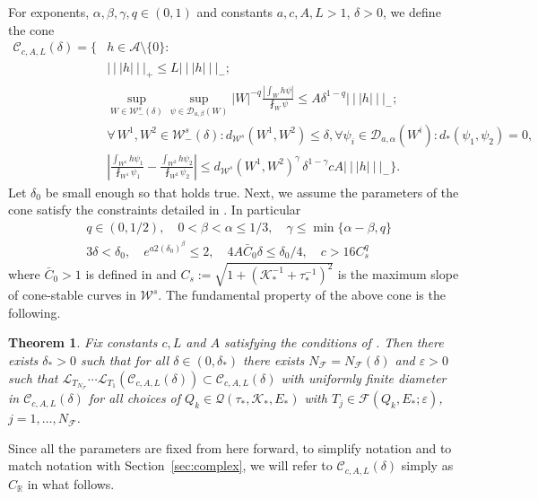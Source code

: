 \documentclass{amsart}
\numberwithin{equation}{section}
\newtheorem{thm}{Theorem}[section]
\newcommand\cA{{\mathcal A}}
\newcommand\cC{{\mathcal C}}
\newcommand\cD{{\mathcal D}}
\newcommand\cF{{\mathcal F}}
\newcommand\cK{{\mathcal K}}
\newcommand\cL{{\mathcal L}}
\newcommand\cQ{{\mathcal Q}}
\newcommand\cW{{\mathcal W}}
\newcommand\bR{{\mathbb R}}
\newcommand\ve{\varepsilon}
\newcommand{\tri}{{|\:\!\!|\:\!\!|}}
\begin{document}
For exponents, $\alpha, \beta, \gamma, q \in (0,1)$  and constants $a, c, A, L >1$, $\delta >0$, we define the cone
\begin{align}
\cC_{c,A, L}(\delta)  =  \Bigg\{ & h \in \cA\setminus \{0\} : \nonumber\\
&\tri h \tri_+\leq L\tri h \tri_- ;
\label{eq:cone 1} \\
& \sup_{W \in \cW^s_-(\delta)} \sup_{\psi \in \cD_{a, \beta}(W)} |W|^{-q}\frac{|\int_W h \psi|}{\fint_W\psi}  \le  A \delta^{1-q} \tri h \tri_- ;
\label{eq:cone 2} \\
&\forall\, W^1, W^2 \in \cW^s_-(\delta):  d_{\cW^s}(W^1, W^2) \le \delta,  \forall \psi_i \in \cD_{a, \alpha}(W^i): d_*(\psi_1, \psi_2)=0, \nonumber\\
&\left|\frac{\int_{W^1} h \psi_1}{\fint_{W^1}\psi_1}  - \frac{\int_{W^2} h \psi_2}{\fint_{W^2}\psi_2} \right|\leq
d_{\cW^s}(W^1, W^2)^\gamma \, \delta^{1-\gamma}   c A \tri h \tri_-  \Bigg\} .
\label{eq:cone 3}
\end{align}
Let $\delta_0$ be small enough so that  \cite[eq.~(3.8)]{DL22} holds true. Next,
we assume the parameters of the cone satisfy the constraints detailed in \cite[Section~5.3]{DL22}. In particular
\begin{equation}\label{eq:const_cond}
\begin{split}
&q \in (0, 1/2),\quad 0<\beta < \alpha \le 1/3, \quad \gamma \le \min \{ \alpha - \beta, q \}\\
&3\delta<\delta_0, \quad e^{a 2(\delta_0)^\beta}   \le 2 , \quad
4A \bar C_0 \delta \le \delta_0/4,\quad c > 16 C_s^q 
\end{split}
\end{equation}
where $\bar C_0>1$ is defined in \cite[Lemm~3.3]{DL22} and $C_s := \sqrt{1 + (\cK_*^{-1} + \tau_*^{-1})^2  }$ is the maximum slope of cone-stable curves in $\cW^s$.
The fundamental property of the above cone is the following.
\begin{thm}{\cite[Theorem~6.12]{DL22}}\label{thm:cone_contraction}
Fix constants $c, L$ and $A$ satisfying the conditions of \cite[Section~5.3]{DL22}.  Then
there exists $\delta_* > 0$ such that for all $\delta \in (0, \delta_*)$ 
there exists
$N_{\cF} = N_{\cF}(\delta)$ and $\ve >0$ such that $\cL_{T_{N_\cF}} \cdots \cL_{T_1} (\cC_{c,A,L}(\delta))\subset \cC_{c,A,L}(\delta)$ with uniformly finite diameter in $\cC_{c,A,L}(\delta)$ for all choices of $Q_k \in \cQ(\tau_*, \cK_*, E_*)$ with $T_j \in \cF(Q_k, E_*; \ve)$, $j=1, \ldots , N_{\cF}$. 
\end{thm}
Since all the parameters are fixed from here forward, to simplify notation and to match notation with
Section~\ref{sec:complex}, we will refer to $\cC_{c,A,L}(\delta)$ simply as $C_{\bR}$ in what follows.
\end{document}
